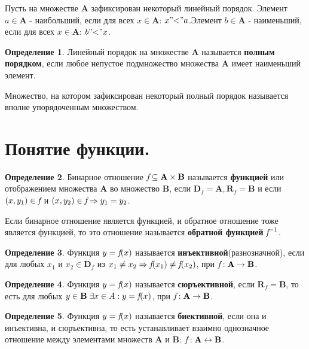 \documentclass[12pt, a4paper, oneside]{article}
\theoremstyle{plain} %
\theoremstyle{definition}
\newtheorem*{definition}{Определение}  %
\newcommand{\indef}[1]{\textbf{ \color{dark_red} #1}}
\begin{document}
Пусть на множестве \textbf{A} зафиксирован некоторый линейный порядок. Элемент $a \in \textbf{A}$ - наибольший, если для всех $x \in \textbf{A}$: $x "\textrm{<}" a$.Элемент $b \in \textbf{A}$ - наименьший, если для всех $x \in \textbf{A}$: $b "\textrm{<}" x$.

\begin{definition}
Линейный порядок на множестве \textbf{A} называется \indef{полным порядком}, если любое непустое подмножество множества \textbf{A} имеет наименьший элемент.
\end{definition}

Множество, на котором зафиксирован некоторый полный порядок называется вполне упорядоченным множеством.

\section{Понятие функции.}

\begin{definition}
Бинарное отношение $\emph{f} \subseteq \textbf{A} \times \textbf{B}$ называется \indef{функцией} или отображением множества \textbf{A} во множество \textbf{B}, если $\textbf{D}_f = \textbf{A}, \textbf{R}_f = \textbf{B}$ и если $(x,y_1) \in \emph{f}$ и $(x,y_2) \in \emph{f} \Rightarrow y_1 = y_2$.
\end{definition}

Если бинарное отношение является функцией, и обратное отношение тоже является функцией, то это отношение называется \indef{обратной функцией} $\emph{f}^{-1}$.

\begin{definition}
Функция $y = \emph{f}(x)$ называется \indef{инъективной}(разнозначной), если для любых $x_1$ и $x_2 \in \textbf{D}_f$ из $x_1 \neq x_2 \Rightarrow \emph{f}(x_1) \neq \emph{f}(x_2)$, при $\emph{f}: \textbf{A} \rightarrow \textbf{B}$. 
\end{definition}

\begin{definition}
Функция $y = \emph{f}(x)$ называется \indef{сюръективной}, если $\textbf{R}_f = \textbf{B}$, то есть для любых $y \in \textbf{B} \hspace{1mm}\exists x \in A: y = \emph{f}(x)$, при $\emph{f}: \textbf{A} \rightarrow \textbf{B}$.
\end{definition}

\begin{definition}
Функция $y = \emph{f}(x)$ называется \indef{биективной}, если она и инъективна, и сюръективна, то есть устанавливает взаимно однозначное отношение между элементами множеств \textbf{A} и \textbf{B}: $\emph{f}: \textbf{A} \leftrightarrow \textbf{B}$. 
\end{definition}
\end{document}
